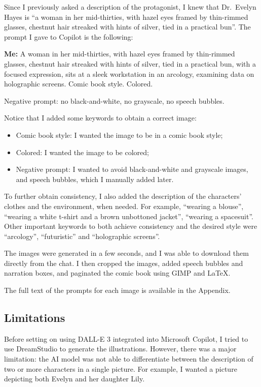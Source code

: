 \documentclass[a4paper,11pt]{article}
\newenvironment{shadedquotation3}
    {\colorlet{shadecolor}{Purple!15}\begin{shaded*}
    \quoting[leftmargin=0cm, rightmargin=0cm, vskip=0pt]
    }
    {\endquoting
    \end{shaded*}
}
\begin{document}
Since I previously asked a description of the protagonist, I knew that Dr.~Evelyn Hayes is ``a woman in her mid-thirties, with hazel eyes framed by thin-rimmed glasses, chestnut hair streaked with hints of silver, tied in a practical bun''. The prompt I gave to Copilot is the following:
\begin{shadedquotation3}
    \textbf{Me:} A woman in her mid-thirties, with hazel eyes framed by thin-rimmed glasses, chestnut hair streaked with hints of silver, tied in a practical bun, with a focused expression, sits at a sleek workstation in an arcology, examining data on holographic screens. Comic book style. Colored.\smallskip

    \noindent Negative prompt: no black-and-white, no grayscale, no speech bubbles.
\end{shadedquotation3}
Notice that I added some keywords to obtain a correct image:
\begin{itemize}
    \item Comic book style: I wanted the image to be in a comic book style;
    \item Colored: I wanted the image to be colored;
    \item Negative prompt: I wanted to avoid black-and-white and grayscale images, and speech bubbles, which I manually added later.
\end{itemize}
To further obtain consistency, I also added the description of the characters' clothes and the environment, when needed. For example, ``wearing a blouse'', ``wearing a white t-shirt and a brown unbottoned jacket'', ``wearing a spacesuit''. Other important keywords to both achieve consistency and the desired style were ``arcology'', ``futuristic'' and ``holographic screens''.

The images were generated in a few seconds, and I was able to download them directly from the chat. I then cropped the images, added speech bubbles and narration boxes, and paginated the comic book using GIMP and \LaTeX.\medskip

The full text of the prompts for each image is available in the Appendix.

\subsection{Limitations}
Before setting on using DALL-E 3 integrated into Microsoft Copilot, I tried to use DreamStudio to generate the illustrations. However, there was a major limitation: the AI model was not able to differentiate between the description of two or more characters in a single picture. For example, I wanted a picture depicting both Evelyn and her daughter Lily.
\end{document}
